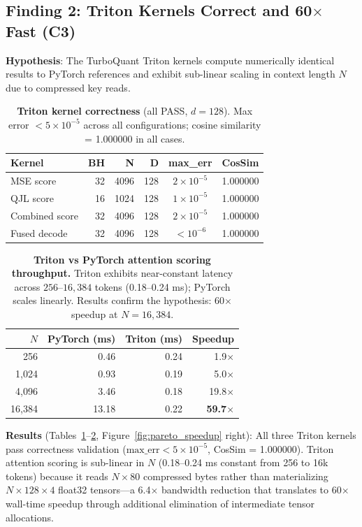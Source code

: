 \documentclass{article}
\begin{document}
\subsection{Finding 2: Triton Kernels Correct and 60$\times$ Fast (C3)}

\textbf{Hypothesis}: The TurboQuant Triton kernels compute numerically identical results to PyTorch references and exhibit sub-linear scaling in context length $N$ due to compressed key reads.

\begin{table}[t]
\centering
\caption{\textbf{Triton kernel correctness} (all PASS, $d=128$). Max error $< 5 \times 10^{-5}$ across all configurations; cosine similarity = 1.000000 in all cases.}
\label{tab:kernels}
\begin{tabular}{lrrrcc}
\toprule
\textbf{Kernel} & \textbf{BH} & \textbf{N} & \textbf{D} & \textbf{max\_err} & \textbf{CosSim} \\
\midrule
MSE score      & 32 & 4096 & 128 & $2\times10^{-5}$ & 1.000000 \\
QJL score      & 16 & 1024 & 128 & $1\times10^{-5}$ & 1.000000 \\
Combined score & 32 & 4096 & 128 & $2\times10^{-5}$ & 1.000000 \\
Fused decode   & 32 & 4096 & 128 & $<10^{-6}$       & 1.000000 \\
\bottomrule
\end{tabular}
\end{table}

\begin{table}[t]
\centering
\caption{\textbf{Triton vs PyTorch attention scoring throughput.} Triton exhibits near-constant latency across $256$–$16{,}384$ tokens (0.18–0.24 ms); PyTorch scales linearly. Results confirm the hypothesis: 60$\times$ speedup at $N=16{,}384$.}
\label{tab:speedup}
\begin{tabular}{rrrr}
\toprule
\textbf{$N$} & \textbf{PyTorch (ms)} & \textbf{Triton (ms)} & \textbf{Speedup} \\
\midrule
256    & 0.46 & 0.24 & 1.9$\times$ \\
1,024  & 0.93 & 0.19 & 5.0$\times$ \\
4,096  & 3.46 & 0.18 & 19.8$\times$ \\
16,384 & 13.18 & 0.22 & \textbf{59.7$\times$} \\
\bottomrule
\end{tabular}
\end{table}

\textbf{Results} (Tables~\ref{tab:kernels}–\ref{tab:speedup}, Figure~\ref{fig:pareto_speedup} right): All three Triton kernels pass correctness validation ($\text{max\_err} < 5 \times 10^{-5}$, CosSim = 1.000000). Triton attention scoring is sub-linear in $N$ (0.18–0.24 ms constant from 256 to 16k tokens) because it reads $N \times 80$ compressed bytes rather than materializing $N \times 128 \times 4$ float32 tensors—a 6.4$\times$ bandwidth reduction that translates to 60$\times$ wall-time speedup through additional elimination of intermediate tensor allocations.
\end{document}
